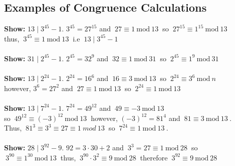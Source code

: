 \documentclass[12pt]{extarticle}
\newcommand{\divides}{\mid}
\renewcommand{\mod}[3]{\: #1 \equiv #2 \: \mathrm{mod} \: #3 \:}
\begin{document}
\newpage

\subsection{Examples of Congruence Calculations}
\textbf{Show:} \quad $13 \divides 3^{45}-1$. \quad $3^{45} = 27^{15}$ and $\mod{27}{1}{13}$ so $ \mod{27^{15}}{1^{15}}{13}$ \\ \indent thus, $\mod{3^{45}}{1}{13}$ i.e $\: 13 \divides 3^{45}-1$
\\\\
\textbf{Show:} \quad $31 \divides 2^{45}-1$. \quad $2^{45} = 32^{9}$ and $\mod{32}{1}{31}$ so $\mod{2^{45}}{1^{9}}{31}$ 
\\\\
\textbf{Show:} \quad $13 \divides 2^{24}-1$. \quad $2^{24} = 16^{6}$ and $\mod{16}{3}{13}$ so $ \mod{2^{24}}{3^{6}}{n}$\\
\indent however, $3^{6} = 27^{2}$ and $\mod{27}{1}{13}$ so $\mod{2^{24}}{1}{13}$
\\\\
\textbf{Show:} \quad $13 \divides 7^{24}-1$. \quad $7^{24} = 49^{12}$ and $\mod{49}{-3}{13}$\\
\indent so $\mod{49^{12}}{(-3)^{12}}{13}$ however, $(-3)^{12} = 81^{4}$ and $\mod{81}{3}{13}$.\\
\indent Thus, $\: 81^{3} \equiv 3^3 \equiv 27 \equiv 1 \: mod \: 13 \:$ so $\mod{7^{24}}{1}{13}$.
\\\\
\textbf{Show:} \quad $28 \divides 3^{92}-9$. \quad $92 = 3 \cdot 30 + 2$ and $\mod{3^3 = 27}{1}{28}$ so \\ \indent $\mod{3^{90}}{1^{30}}{13}$ thus, $\mod{3^90 \cdot 3^2}{9}{28}$ therefore $\mod{3^{92}}{9}{28}$ 
\\\\
\end{document}
